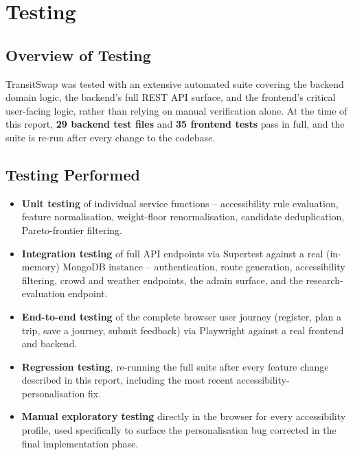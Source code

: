\documentclass[12pt,a4paper]{report}
\begin{document}
\chapter{Testing}

\section{Overview of Testing}

TransitSwap was tested with an extensive automated suite covering the backend domain logic, the
backend's full REST API surface, and the frontend's critical user-facing logic, rather than relying
on manual verification alone. At the time of this report, \textbf{29 backend test files} and
\textbf{35 frontend tests} pass in full, and the suite is re-run after every change to the codebase.

\section{Testing Performed}

\begin{itemize}[leftmargin=*]
  \item \textbf{Unit testing} of individual service functions -- accessibility rule evaluation,
    feature normalisation, weight-floor renormalisation, candidate deduplication, Pareto-frontier
    filtering.
  \item \textbf{Integration testing} of full API endpoints via Supertest against a real (in-memory)
    MongoDB instance -- authentication, route generation, accessibility filtering, crowd and weather
    endpoints, the admin surface, and the research-evaluation endpoint.
  \item \textbf{End-to-end testing} of the complete browser user journey (register, plan a trip,
    save a journey, submit feedback) via Playwright against a real frontend and backend.
  \item \textbf{Regression testing}, re-running the full suite after every feature change described
    in this report, including the most recent accessibility-personalisation fix.
  \item \textbf{Manual exploratory testing} directly in the browser for every accessibility profile,
    used specifically to surface the personalisation bug corrected in the final implementation
    phase.
\end{itemize}
\end{document}
